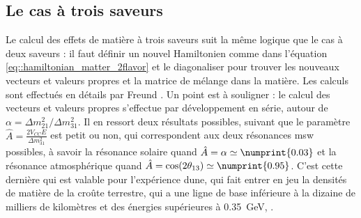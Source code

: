         \subsection{Le cas à trois saveurs}\label{sec::3flavor_matter}
            Le calcul des effets de matière à trois saveurs suit la même logique que le cas à deux saveurs : il faut définir un nouvel Hamiltonien comme dans l'équation \eqref{eq::hamiltonian_matter_2flavor} et le diagonaliser pour trouver les nouveaux vecteurs et valeurs propres et la matrice de mélange dans la matière. Les calculs sont effectués en détails par Freund \cite{Freund2001}. Un point est à souligner : le calcul des vecteurs et valeurs propres s'effectue par développement en série, autour de $\alpha=\Delta m^2_{21}/\Delta m^2_{31}$. Il en ressort deux résultats possibles, suivant que le paramètre $\hat{A}=\frac{2V_{CC}E}{\Delta m^2_{31}}$ est petit ou non, qui correspondent aux deux résonances \gls{msw} possibles, à savoir la résonance solaire quand $\hat{A}=\alpha\simeq\numprint{0.03}$ et la résonance atmosphérique quand $\hat{A}=\cos(2\theta_{13})\simeq \numprint{0.95}$. C'est cette dernière qui est valable pour l'expérience \gls{dune}, qui fait entrer en jeu la densités de matière de la croûte terrestre, qui a une ligne de base inférieure à la dizaine de milliers de kilomètres et des énergies supérieures à \SI{0.35}{\giga\electronvolt}\cite{Giganti2017}, .
            
